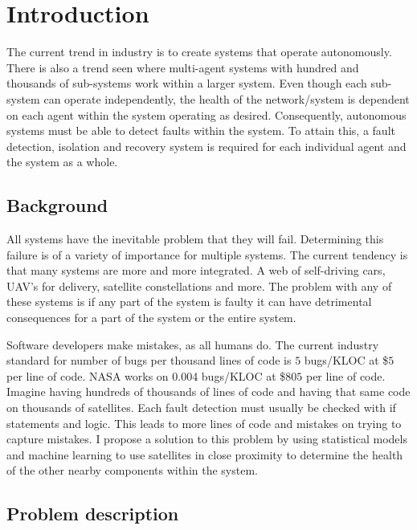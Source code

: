%
%


\chapter{Introduction}
\label{chap:Introduction}


The current trend in industry is to create systems that operate autonomously. There is also a trend seen where multi-agent systems with hundred and thousands of sub-systems work within a larger system. Even though each sub-system can operate independently, the health of the network/system is dependent on each agent within the system operating as desired. Consequently, autonomous systems must be able to detect faults within the system. To attain this, a fault detection, isolation and recovery system is required for each individual agent and the system as a whole.

\section{Background}
All systems have the inevitable problem that they will fail. Determining this failure is of a variety of importance for multiple systems. The current tendency is that many systems are more and more integrated. A web of self-driving cars, UAV's for delivery, satellite constellations and more. The problem with any of these systems is if any part of the system is faulty it can have detrimental consequences for a part of the system or the entire system.

Software developers make mistakes, as all humans do. The current industry standard for number of bugs per thousand lines of code is $5$ bugs/KLOC at \$$5$ per line of code. NASA works on 0.004 bugs/KLOC at \$$805$ per line of code. Imagine having hundreds of thousands of lines of code and having that same code on thousands of satellites. Each fault detection must usually be checked with if statements and logic. This leads to more lines of code and mistakes on trying to capture mistakes. I propose a solution to this problem by using statistical models and machine learning to use satellites in close proximity to determine the health of the other nearby components within the system.

\section{Problem description}

